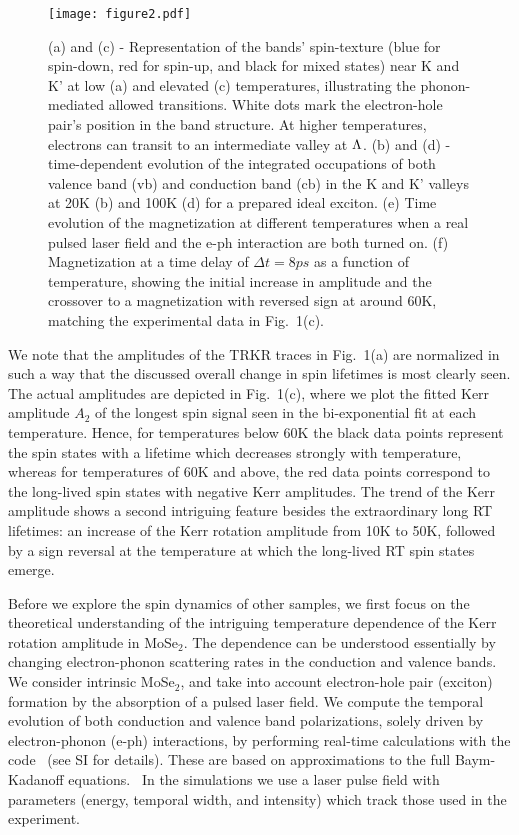 \documentclass[prb,aps,superscriptaddress,reprint]{revtex4-1}
\begin{document}
\begin{figure*}[tb]
		\texttt{[image: figure2.pdf]}
	\caption{(a) and (c) - Representation of the bands' spin-texture (blue for spin-down, red for spin-up, and black for mixed states) near K and K' at low (a) and elevated (c) temperatures, illustrating the phonon-mediated allowed transitions. White dots mark the electron-hole pair's position in the band structure. At higher temperatures, electrons can transit to an intermediate valley at $\Lambda$. (b) and (d) - time-dependent evolution of the integrated occupations of both valence band (vb) and conduction band (cb) in the K and K' valleys at \unit{20}{K} (b) and \unit{100}{K} (d) for a prepared ideal exciton. (e) Time evolution of the magnetization at different temperatures when a real pulsed laser field and the e-ph interaction are both turned on. (f) Magnetization at a time delay of $\Delta t = \unit{8}{ps}$ as a function of temperature, showing the initial increase in amplitude and the crossover to a magnetization with reversed sign at around \unit{60}{K}, matching the experimental data in Fig.~1(c).}
	\label{figure2}
\end{figure*}

We note that the amplitudes of the TRKR traces in Fig.~1(a) are normalized in such a way that the discussed overall change in spin lifetimes is most clearly seen. The actual amplitudes are depicted in Fig.~1(c), where we plot the fitted Kerr amplitude $A_2$ of the longest spin signal seen in the bi-exponential fit at each temperature. Hence, for temperatures below \unit{60}{K} the black data points represent the spin states with a lifetime which decreases strongly with temperature, whereas for temperatures of \unit{60}{K} and above, the red data points correspond to the long-lived spin states with negative Kerr amplitudes. The trend of the Kerr amplitude shows a second intriguing feature besides the extraordinary long RT lifetimes: an increase of the Kerr rotation amplitude from \unit{10}{K} to \unit{50}{K}, followed by a sign reversal at the temperature at which the long-lived RT spin states emerge.

Before we explore the spin dynamics of other samples, we first focus on the theoretical understanding of the intriguing temperature dependence of the Kerr rotation amplitude in MoSe$_2$. The dependence can be understood essentially by changing electron-phonon scattering rates in the conduction and valence bands. We consider intrinsic MoSe$_2$, and take into account electron-hole pair (exciton) formation by the absorption of a pulsed laser field. We compute the temporal evolution of both conduction and valence band polarizations, solely driven by electron-phonon (e-ph) interactions, by performing real-time calculations with the \Yambo{} code~\cite{Sangalli2019} (see SI for details). These are based on approximations to the full Baym-Kadanoff equations.~\cite{pedro-paper,m.2012,PhysRevB.84.245110,PhysRevB.92.205304} In the simulations we use a laser pulse field with parameters (energy, temporal width, and intensity) which track those used in the experiment.
\end{document}
